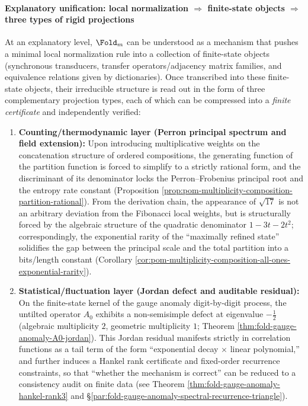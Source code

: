 \paragraph{Explanatory unification: local normalization \texorpdfstring{$\Rightarrow$}{=>} finite-state objects \texorpdfstring{$\Rightarrow$}{=>} three types of rigid projections}
At an explanatory level, \(\Fold_m\) can be understood as a mechanism that pushes a minimal local normalization rule into a collection of finite-state objects (synchronous transducers, transfer operators/adjacency matrix families, and equivalence relations given by dictionaries).
Once transcribed into these finite-state objects, their irreducible structure is read out in the form of three complementary projection types, each of which can be compressed into a \emph{finite certificate} and independently verified:
\begin{enumerate}
  \item \textbf{Counting/thermodynamic layer (Perron principal spectrum and field extension):}
  Upon introducing multiplicative weights on the concatenation structure of ordered compositions, the generating function of the partition function is forced to simplify to a strictly rational form, and the discriminant of its denominator locks the Perron--Frobenius principal root and the entropy rate constant (Proposition \ref{prop:pom-multiplicity-composition-partition-rational}).
  From the derivation chain, the appearance of \(\sqrt{17}\) is not an arbitrary deviation from the Fibonacci local weights, but is structurally forced by the algebraic structure of the quadratic denominator \(1-3t-2t^2\); correspondingly, the exponential rarity of the ``maximally refined state'' solidifies the gap between the principal scale and the total partition into a bits/length constant (Corollary \ref{cor:pom-multiplicity-composition-all-ones-exponential-rarity}).
  \item \textbf{Statistical/fluctuation layer (Jordan defect and auditable residual):}
  On the finite-state kernel of the gauge anomaly digit-by-digit process, the untilted operator \(A_0\) exhibits a non-semisimple defect at eigenvalue \(-\tfrac12\) (algebraic multiplicity \(2\), geometric multiplicity \(1\); Theorem \ref{thm:fold-gauge-anomaly-A0-jordan}).
  This Jordan residual manifests strictly in correlation functions as a tail term of the form ``exponential decay \(\times\) linear polynomial,'' and further induces a Hankel rank certificate and fixed-order recurrence constraints, so that ``whether the mechanism is correct'' can be reduced to a consistency audit on finite data (see Theorem \ref{thm:fold-gauge-anomaly-hankel-rank3} and \S\ref{par:fold-gauge-anomaly-spectral-recurrence-triangle}).

\end{enumerate}
